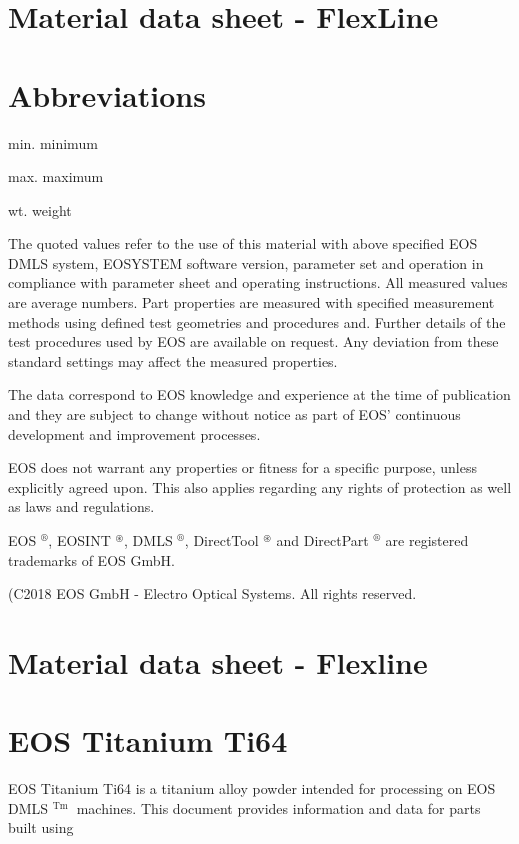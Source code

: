 \documentclass[10pt]{article}
\begin{document}
\section*{Material data sheet - FlexLine}
\section*{Abbreviations}
min. minimum

max. maximum

wt. weight

The quoted values refer to the use of this material with above specified EOS DMLS system, EOSYSTEM software version, parameter set and operation in compliance with parameter sheet and operating instructions. All measured values are average numbers. Part properties are measured with specified measurement methods using defined test geometries and procedures and. Further details of the test procedures used by EOS are available on request. Any deviation from these standard settings may affect the measured properties.

The data correspond to EOS knowledge and experience at the time of publication and they are subject to change without notice as part of EOS' continuous development and improvement processes.

EOS does not warrant any properties or fitness for a specific purpose, unless explicitly agreed upon. This also applies regarding any rights of protection as well as laws and regulations.

EOS $^{\circledR}$, EOSINT $^{\circledast}$, DMLS $^{\circledR}$, DirectTool $^{\circledast}$ and DirectPart ${ }^{\circledR}$ are registered trademarks of EOS GmbH.

(C2018 EOS GmbH - Electro Optical Systems. All rights reserved.

\section*{Material data sheet - Flexline}
\section*{EOS Titanium Ti64}
EOS Titanium Ti64 is a titanium alloy powder intended for processing on EOS DMLS ${ }^{\text {Tm }}$ machines. This document provides information and data for parts built using
\end{document}

